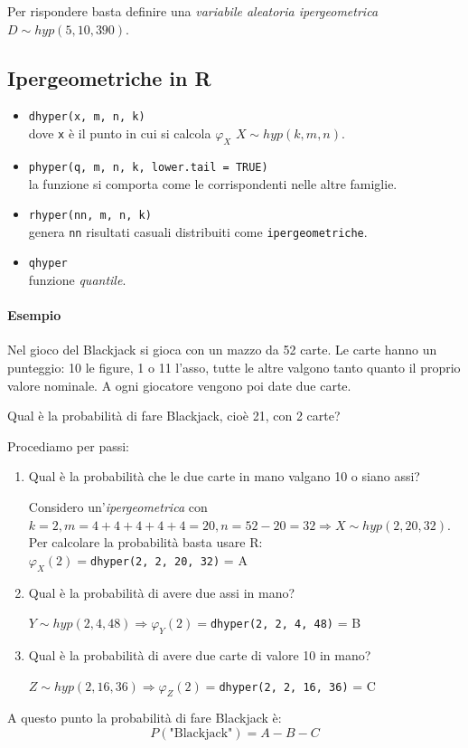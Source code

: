 \documentclass[12pt, a4paper]{report}
\theoremstyle{definition}
\begin{document}
Per rispondere basta definire una \emph{variabile aleatoria ipergeometrica} \(D
\sim hyp(5,10,390)\).

\subsection{Ipergeometriche in R}
\begin{itemize}
	\item \texttt{dhyper(x, m, n, k)}\\
	dove \texttt{x} è il punto in cui si calcola $\varphi_X$ $X\sim hyp(k,m,n)$.
	\item \texttt{phyper(q, m, n, k, lower.tail = TRUE)}\\
	la funzione si comporta come le corrispondenti nelle altre famiglie.
	\item \texttt{rhyper(nn, m, n, k)}\\
	genera \texttt{nn} risultati casuali distribuiti come \texttt{ipergeometriche}.
	\item \texttt{qhyper}\\
	funzione \emph{quantile}.
\end{itemize}

\paragraph*{Esempio}
Nel gioco del Blackjack si gioca con un mazzo da 52 carte. Le carte hanno un
punteggio: 10 le figure, 1 o 11 l'asso, tutte le altre valgono tanto quanto il
proprio valore nominale. A ogni giocatore vengono poi date due carte.

Qual è la probabilità di fare Blackjack, cioè 21, con 2 carte?

Procediamo per passi:
\begin{enumerate}[label=(\roman*)]
	\item Qual è la probabilità che le due carte in mano valgano 10 o siano assi?
	
	Considero un'\emph{ipergeometrica} con \(k=2, m=4+4+4+4+4=20, n=52-20=32
	\Rightarrow X\sim hyp(2,20,32)\).
	Per calcolare la probabilità basta usare R:\\
	$\varphi_X(2)=$\texttt{dhyper(2, 2, 20, 32)} = A
	\item Qual è la probabilità di avere due assi in mano?
	
	\(Y\sim hyp(2,4,48)\Rightarrow\varphi_Y(2)=\)\texttt{dhyper(2, 2, 4, 48)} = B
	\item Qual è la probabilità di avere due carte di valore 10 in mano?
	
	\(Z\sim hyp(2,16,36)\Rightarrow\varphi_Z(2)=\)\texttt{{dhyper(2, 2, 16, 36)}} = C
\end{enumerate}
A questo punto la probabilità di fare Blackjack è:
\[P(\text{"Blackjack"})=A-B-C\]
\end{document}

